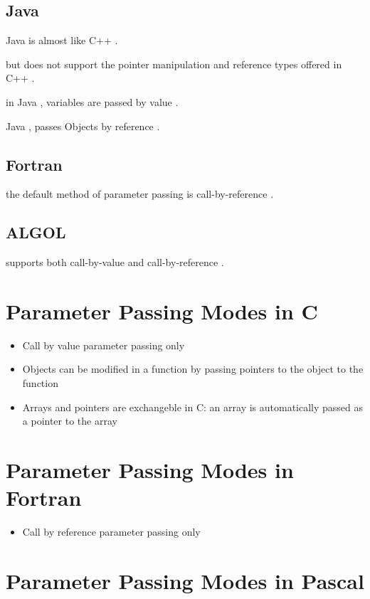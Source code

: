 \documentclass[12pt]{article}
\begin{document}
\subsection{Java}

Java is almost like C++ . 

but does not support the pointer manipulation and reference types offered in C++ .

in Java , variables are passed by value .

Java , passes Objects by reference .


\subsection{Fortran}

the default method of parameter passing is call-by-reference .

\subsection{ALGOL}

supports both call-by-value and call-by-reference .


\section{Parameter Passing Modes in C}

\begin{itemize}
	\item Call by value parameter passing only
	\item Objects can be modified in a function by passing pointers to the object to the function
	\item Arrays and pointers are exchangeble in C: an array is
automatically passed as a pointer to the array
\end{itemize}



\section{Parameter Passing Modes in Fortran}

\begin{itemize}
	\item Call by reference parameter passing only
\end{itemize}



\section{Parameter Passing Modes in Pascal}
\end{document}
